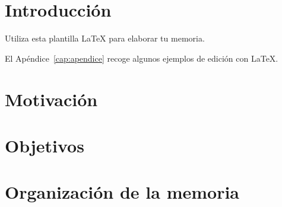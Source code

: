 
\section{Introducción}

Utiliza esta plantilla \LaTeX{} para elaborar tu memoria. 

El Apéndice~\ref{cap:apendice} recoge algunos ejemplos de edición
con \LaTeX{}.

\section{Motivación}


\section{Objetivos}


\section{Organización de la memoria}
